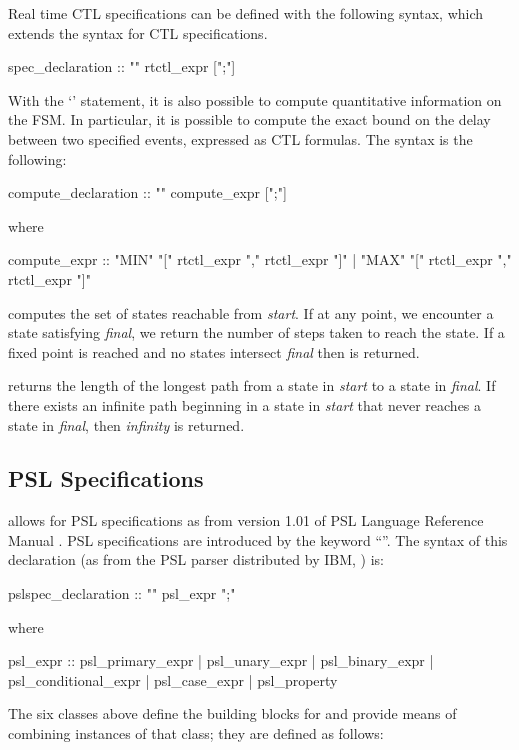 %
Real time CTL specifications can be defined with the following syntax,
which extends the syntax for CTL specifications.
%
\begin{Grammar}
spec_declaration :: "" rtctl_expr [";"]
\end{Grammar}
%
With the `' statement, it is also possible to compute
quantitative information on the FSM. In particular, it is possible to
compute the exact bound on the delay between two specified events,
expressed as CTL formulas. The syntax is the following:
%
\begin{Grammar}
compute_declaration :: "" compute_expr [";"]
\end{Grammar}
%
where
%
\begin{Grammar}
compute_expr :: "MIN" "[" rtctl_expr "," rtctl_expr "]"
              | "MAX" "[" rtctl_expr "," rtctl_expr "]"
\end{Grammar}
%
 computes the set of states
reachable from \textit{start}. If at any point, we encounter a state
satisfying \textit{final}, we return the number of steps taken to
reach the state. If a fixed point is reached and no states intersect
\textit{final} then  is returned.

\noindent {} returns the length of
the longest path from a state in \textit{start} to a state in
\textit{final}. If there exists an infinite path beginning in a state
in \textit{start} that never reaches a state in \textit{final}, then
\textit{infinity} is returned.


\subsection{PSL Specifications}
\label{PSL Specifications}
%
\nusmv allows for PSL specifications as from version 1.01 of PSL
Language Reference Manual \cite{PSLLRM}. PSL specifications
are introduced by the keyword ``''. The syntax of this
declaration (as from the PSL parser distributed by IBM, \cite{PSLparser}) is:
%
\begin{Grammar}
pslspec_declaration :: "" psl_expr ";"
\end{Grammar}
%
where
%
\begin{Grammar}
psl_expr ::
   psl_primary_expr
 | psl_unary_expr
 | psl_binary_expr
 | psl_conditional_expr
 | psl_case_expr
 | psl_property
\end{Grammar}
%
The six classes above define the building blocks for
 and provide means of combining
instances of that class; they are defined as follows:

